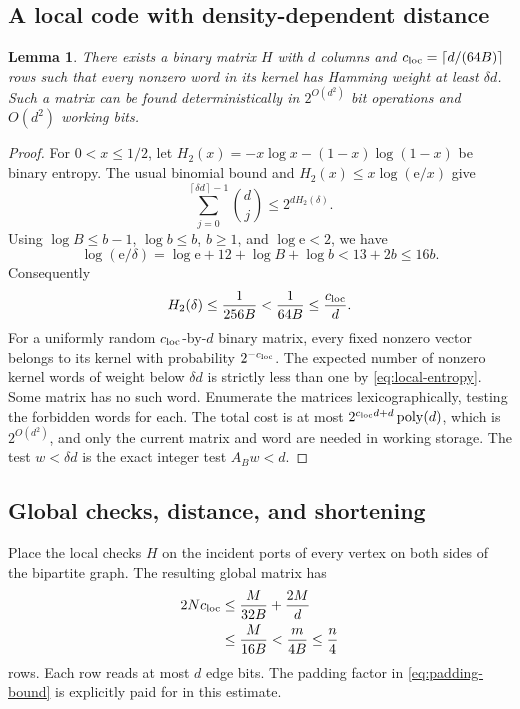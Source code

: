 \documentclass[11pt]{article}
\numberwithin{equation}{section}
\newtheorem{lemma}[theorem]{Lemma}
\theoremstyle{definition}\newtheorem{definition}[theorem]{Definition}
\theoremstyle{remark}\newtheorem{remark}[theorem]{Remark}
\DeclareMathOperator{\poly}{poly}
\newcommand{\ceil}[1]{\left\lceil#1\right\rceil}
\begin{document}
\subsection{A local code with density-dependent distance}

\begin{lemma}\label{lem:local-code}
There exists a binary matrix $H$ with $d$ columns and
$c_{\rm loc}=\ceil{d/(64B)}$ rows such that every nonzero word in
its kernel has Hamming weight at least $\delta d$. Such a matrix
can be found deterministically in $2^{O(d^2)}$ bit operations and
$O(d^2)$ working bits.
\end{lemma}
\begin{proof}
For $0<x\le1/2$, let
$H_2(x)=-x\log x-(1-x)\log(1-x)$ be binary entropy. The usual
binomial bound and $H_2(x)\le x\log(\mathrm e/x)$ give
\[
 \sum_{j=0}^{\ceil{\delta d}-1}\binom dj
      \le2^{dH_2(\delta)}.
\]
Using $\log B\le b-1$, $\log b\le b$, $b\ge1$, and
$\log\mathrm e<2$, we have
\[
 \log(\mathrm e/\delta)
   =\log\mathrm e+12+\log B+\log b
   <13+2b\le16b.
\]
Consequently
\begin{equation}\label{eq:local-entropy}
 H_2(\delta)\le\frac1{256B}
     <\frac1{64B}\le\frac{c_{\rm loc}}d.
\end{equation}
For a uniformly random $c_{\rm loc}$-by-$d$ binary matrix, every
fixed nonzero vector belongs to its kernel with probability
$2^{-c_{\rm loc}}$. The expected number of nonzero kernel words
of weight below $\delta d$ is strictly less than one by
\eqref{eq:local-entropy}. Some matrix has no such word. Enumerate
the matrices lexicographically, testing the forbidden words for each.
The total cost is at most $2^{c_{\rm loc}d+d}\poly(d)$, which is
$2^{O(d^2)}$, and only the current matrix and word are needed in
working storage. The test $w<\delta d$ is the exact integer test
$A_Bw<d$.
\end{proof}

\subsection{Global checks, distance, and shortening}

Place the local checks $H$ on the incident ports of every vertex on
both sides of the bipartite graph. The resulting global matrix has
\begin{align}
 2Nc_{\rm loc}
   &\le\frac{M}{32B}+\frac{2M}{d}\notag\\
   &\le\frac{M}{16B}<\frac{m}{4B}\le\frac n4
 \label{eq:row-count}
\end{align}
rows. Each row reads at most $d$ edge bits. The padding factor in
\eqref{eq:padding-bound} is explicitly paid for in this estimate.
\end{document}
